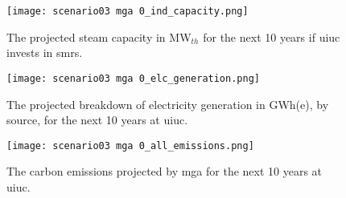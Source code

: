 \begin{figure}[ht!]
	\centering
	\texttt{[image: scenario03 mga 0\_ind\_capacity.png]}
	\caption{The projected steam capacity in MW$_{th}$ for the next 10 years if
	\gls{uiuc} invests in \glspl{smr}.}
	\label{fig:mga_ind_cap}
\end{figure}

\begin{figure}[ht!]
	\centering
	\texttt{[image: scenario03 mga 0\_elc\_generation.png]}
	\caption{The projected breakdown of electricity generation in GWh(e), by
	source, for the next 10 years at \gls{uiuc}.}
	\label{fig:mga_elc_gen}
\end{figure}

\begin{figure}[ht!]
	\centering
	\texttt{[image: scenario03 mga 0\_all\_emissions.png]}
	\caption{The carbon emissions projected by \gls{mga} for the next 10 years at
	\gls{uiuc}.}
	\label{fig:mga_all_co2}
\end{figure}
